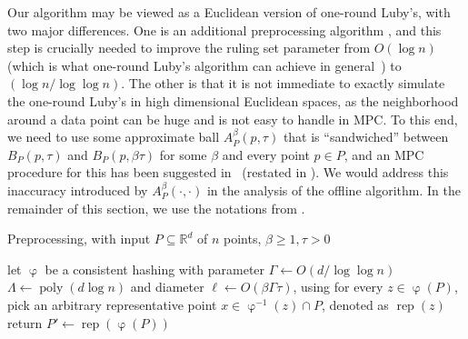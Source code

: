 \documentclass[11pt,letterpaper]{article}
\theoremstyle{plain}
\theoremstyle{definition}
\theoremstyle{remark}
\DeclareMathOperator{\poly}{poly}
\DeclareMathOperator*{\hash}{\varphi}
\DeclareMathOperator*{\rep}{rep}
\begin{document}
Our algorithm may be viewed as a Euclidean version of one-round Luby's,
with two major differences. One is an additional preprocessing algorithm ,
and this step is crucially needed to improve the ruling set parameter from $O(\log n)$ (which is what one-round Luby's algorithm can achieve in general~\cite{dist_graph_book}) to $(\log n / \log\log n)$.
The other is that it is not immediate to exactly simulate the one-round Luby's in high dimensional Euclidean spaces,
as the neighborhood around a data point can be huge and is not easy to handle in MPC.
To this end, we need to use some approximate ball $A^\beta_P(p, \tau)$ that is ``sandwiched'' between $B_P(p, \tau)$ and $B
_{P}(p, \beta \tau)$ for some $\beta$ and every point $p \in P$,
and an MPC procedure for this has been suggested in~\cite{CGJKV24} (restated in ).
We would address this inaccuracy introduced by $A^\beta_P(\cdot, \cdot)$ in the analysis of the offline algorithm.
In the remainder of this section, we use the notations from .




\begin{algorithm}
    \begin{algorithmic}[1]
        \caption{Preprocessing, with input $P \subseteq \mathbb{R}^d$ of $n$ points, $\beta \geq 1, \tau > 0$}
        \label{alg:rs_hash}
\State let $\hash$  be a consistent hashing with parameter $\Gamma \gets O(d / \log\log n)$
        $\Lambda \gets \poly(d\log n)$ and diameter $\ell \gets O(\beta\Gamma \tau)$, using 
\State for every $z \in \hash(P)$, pick an arbitrary representative point $x \in \hash^{-1}(z) \cap P$,
        denoted as $\rep(z)$
        \State return $P' \gets \rep(\hash(P))$
\end{algorithmic}
\end{algorithm}
\end{document}
